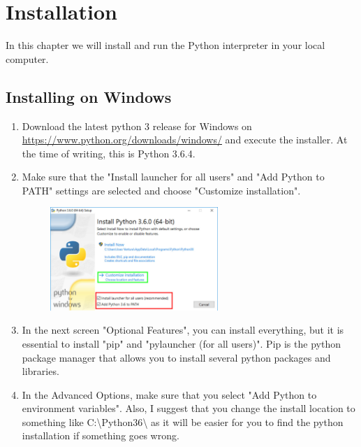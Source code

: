 \chapter{Installation}\label{installation}

In this chapter we will install and run the Python interpreter in your local computer.

\section{Installing on Windows}

\begin{enumerate}

\item Download the latest python 3 release for Windows on \url{https://www.python.org/downloads/windows/} and execute the installer. At the time of writing, this is Python 3.6.4.

\item Make sure that the "Install launcher for all users" and "Add Python to PATH" settings are selected and choose "Customize installation".

\begin{figure}[H]
	\centering
  	\includegraphics[width=0.6\textwidth]{images/python_windows.jpg}
\end{figure}

\item In the next screen "Optional Features", you can install everything, but it is essential to install "pip" and "pylauncher (for all users)". Pip is the python package manager that allows you to install several python packages and libraries.

\item In the Advanced Options, make sure that you select "Add Python to environment variables". Also, I suggest that you change the install location to something like C:{\textbackslash}Python36{\textbackslash} as it will be easier for you to find the python installation if something goes wrong.


\end{enumerate}
